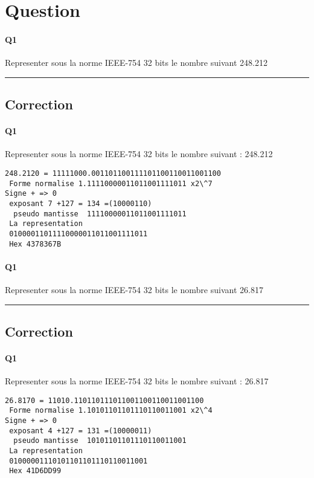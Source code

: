 
\section{Question}


\paragraph{Q1}

Representer sous la norme IEEE-754 32 bits le nombre suivant
248.212

\hrule width 1\linewidth
\pagebreak

\subsection{Correction}


\paragraph{Q1}

Representer sous la norme IEEE-754 32 bits le nombre suivant : 248.212

\begin{verbatim}248.2120 = 11111000.001101100111101100110011001100
 Forme normalise 1.11110000011011001111011 x2\^7
Signe + => 0
 exposant 7 +127 = 134 =(10000110)
  pseudo mantisse  11110000011011001111011 
 La representation 
 01000011011110000011011001111011
 Hex 4378367B

\end{verbatim}
\pagebreak

\paragraph{Q1}

Representer sous la norme IEEE-754 32 bits le nombre suivant
26.817

\hrule width 1\linewidth
\pagebreak

\subsection{Correction}


\paragraph{Q1}

Representer sous la norme IEEE-754 32 bits le nombre suivant : 26.817

\begin{verbatim}26.8170 = 11010.110110111011001100110011001100
 Forme normalise 1.10101101101110110011001 x2\^4
Signe + => 0
 exposant 4 +127 = 131 =(10000011)
  pseudo mantisse  10101101101110110011001 
 La representation 
 01000001110101101101110110011001
 Hex 41D6DD99

\end{verbatim}
\pagebreak

